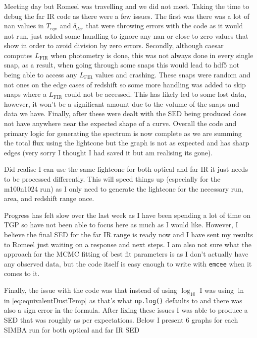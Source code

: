 \documentclass[a4paper, 11pt, oneside]{researchjournal} %
\begin{document}
 Meeting day but Romeel was travelling and we did not meet. Taking the time to debug the far IR code as there were a few issues. The first was there was a lot of nan values in $T_{eqv}$ and $\delta_{dzr}$ that were throwing errors with the code as it would not run, just added some handling to ignore any nan or close to zero values that show in order to avoid division by zero errors. Secondly, although caesar computes $L_\mathrm{FIR}$ when photometry is done, this was not always done in every single snap, as a result, when going through some snaps this would lead to hdf5 not being able to access any $L_\mathrm{FIR}$ values and crashing. These snaps were random and not ones on the edge cases of redshift so some more handling was added to skip snaps where a $L_\mathrm{FIR}$ could not be accessed. This has likely led to some lost data, however, it won't be a significant amount due to the volume of the snaps and data we have. Finally, after these were dealt with the SED being produced does not have anywhere near the expected shape of a curve. Overall the code and primary logic for generating the spectrum is now complete as we are summing the total flux using the lightcone but the graph is not as expected and has sharp edges (very sorry I thought I had saved it but am realising its gone). 

Did realise I can use the same lightcone for both optical and far IR it just needs to be processed differently. This will speed things up (especially for the m100n1024 run) as I only need to generate the lightcone for the necessary run, area, and redshift range once.

 Progress has felt slow over the last week as I have been spending a lot of time on TGP so have not been able to focus here as much as I would like. However, I believe the final SED for the far IR range is ready now and I have sent my results to Romeel just waiting on a response and next steps. I am also not sure what the approach for the MCMC fitting of best fit parameters is as I don't actually have any observed data, but the code itself is easy enough to write with \texttt{emcee} when it comes to it.

Finally, the issue with the code was that instead of using $\log_{10}$ I was using $\ln$ in \cref{eq:equivalentDustTemp} as that's what \texttt{np.log()} defaults to and there was also a sign error in the formula. After fixing these issues I was able to produce a SED that was roughly as per expectations. Below I present 6 graphs for each SIMBA run for both optical and far IR SED
\end{document}
